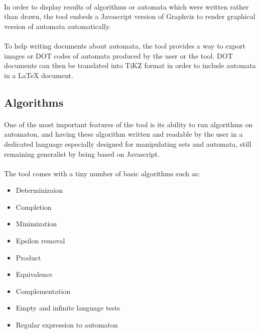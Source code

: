 \documentclass{article}
\begin{document}
\begin{sloppypar}
      
\paragraph{}
In order to display results of algorithms or automata which were written rather than drawn, the tool embeds a Javascript version of Graphviz to render graphical version of automata automatically.

      
\paragraph{}
To help writing documents about automata, the tool provides a way to export images or DOT codes of automata produced by the user or the tool. DOT documents can then be translated into TiKZ format in order to include automata in a LaTeX document.
   
   
   

\subsection{ Algorithms}


\paragraph{}
One of the most important features of the tool is its ability to run algorithms on automaton, and having these algorithm written and readable by the user in a dedicated language especially designed for manipulating sets and automata, still remaining generalist by being based on Javascript.

      
\paragraph{}
The tool comes with a tiny number of basic algorithms such as:
       
\begin{itemize}
	\item{ Determinizaion}
	\item{ Completion}
	\item{ Minimization}
	\item{ Epsilon removal}
	\item{ Product}
	\item{ Equivalence}
	\item{ Complementation}
	\item{ Empty and infinite language tests}
	\item{ Regular expression to automaton}
\end{itemize}


\end{sloppypar}
\end{document}
